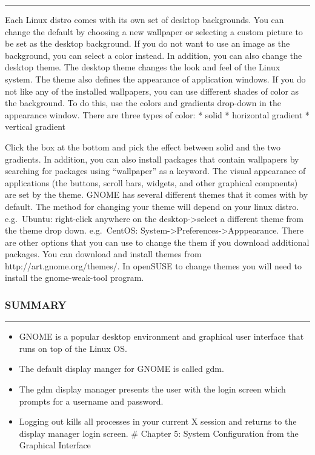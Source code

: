 \begin{center}\rule{3in}{0.4pt}\end{center}

Each Linux distro comes with its own set of desktop backgrounds. You can
change the default by choosing a new wallpaper or selecting a custom
picture to be set as the desktop background. If you do not want to use
an image as the background, you can select a color instead. In addition,
you can also change the desktop theme. The desktop theme changes the
look and feel of the Linux system. The theme also defines the appearance
of application windows. If you do not like any of the installed
wallpapers, you can use different shades of color as the background. To
do this, use the colors and gradients drop-down in the appearance
window. There are three types of color: * solid * horizontal gradient *
vertical gradient

Click the box at the bottom and pick the effect between solid and the
two gradients. In addition, you can also install packages that contain
wallpapers by searching for packages using ``wallpaper'' as a keyword.
The visual appearance of applications (the buttons, scroll bars,
widgets, and other graphical compnents) are set by the theme. GNOME has
several different themes that it comes with by default. The method for
changing your theme will depend on your linux distro. e.g.~Ubuntu:
right-click anywhere on the desktop-\textgreater{}select a different
theme from the theme drop down. e.g.~CentOS:
System-\textgreater{}Preferences-\textgreater{}Apppearance. There are
other options that you can use to change the them if you download
additional packages. You can download and install themes from
http://art.gnome.org/themes/. In openSUSE to change themes you will need
to install the gnome-weak-tool program.

\subsubsection{SUMMARY}\label{summary-3}

\begin{center}\rule{3in}{0.4pt}\end{center}

\begin{itemize}
\itemsep1pt\parskip0pt
\item
  GNOME is a popular desktop environment and graphical user interface
  that runs on top of the Linux OS.
\item
  The default display manger for GNOME is called gdm.
\item
  The gdm display manager presents the user with the login screen which
  prompts for a username and password.
\item
  Logging out kills all processes in your current X session and returns
  to the display manager login screen. \# Chapter 5: System
  Configuration from the Graphical Interface
\end{itemize}

